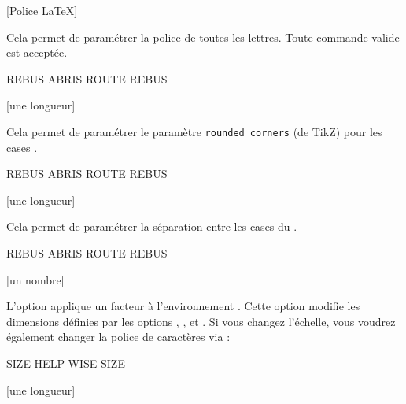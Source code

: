 \documentclass[svgnames]{report}
\begin{document}
       [Police \LaTeX]

  Cela permet de paramétrer la police de toutes les lettres. Toute commande valide est acceptée.

  \begin{example}
  \begin{GrilleSutom}[Police=\large\ttfamily]{REBUS}
    ABRIS
    ROUTE
    REBUS
  \end{GrilleSutom}
  \end{example}

  [une longueur]

  Cela permet de paramétrer le paramètre \texttt{rounded corners} (de TikZ) pour les cases .

  \begin{example}
  \begin{GrilleSutom}[Arrondi=2.5mm]{REBUS}
    ABRIS
    ROUTE
    REBUS
  \end{GrilleSutom}
  \end{example}

  [une longueur]

  Cela permet de paramétrer la séparation entre les cases du .

  \begin{example}
  \begin{GrilleSutom}[Separation=2mm,
                      CouleurBordures=black]{REBUS}
    ABRIS
    ROUTE
    REBUS
  \end{GrilleSutom}
  \end{example}

  [un nombre]

  L'option  applique un facteur à l'environnement .
  Cette option modifie les dimensions définies par les options ,
  ,  et . Si vous changez l'échelle, vous voudrez également changer la police de caractères via  :

  \begin{example}
  \begin{GrilleSutom}[Echelle=1.5,Police=\huge\bfseries]{SIZE}
     HELP
     WISE
     SIZE
  \end{GrilleSutom}
  \end{example}

  [une longueur]
\end{document}
